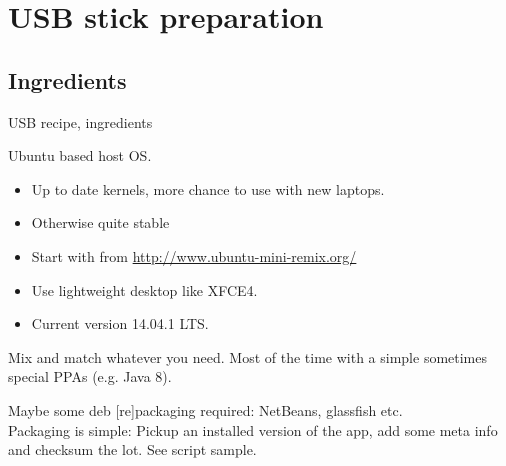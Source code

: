 \section[The cooking]{USB stick preparation}
\subsection{Ingredients}
\begin{frame}{USB recipe, ingredients}
  \begin{description}[short]
  \item[Distribution] Ubuntu based host OS.
    \begin{itemize}
    \item Up to date kernels, more chance to use with new laptops.
    \item Otherwise quite stable
    \item Start with  from
      \url{http://www.ubuntu-mini-remix.org/}
    \item Use lightweight desktop like XFCE4.
    \item Current version 14.04.1 LTS.
    \end{itemize}
  \item[Apps]  Mix and match whatever you need. Most of the time with a
    simple  sometimes special PPAs (e.g. Java 8).
  \item[Home grown packages] Maybe some deb [re]packaging required:
    NetBeans, glassfish etc.\\
    Packaging is simple: Pickup an installed version of the app, add some meta
    info and checksum the lot. See script sample.
  \end{description}
\end{frame}

